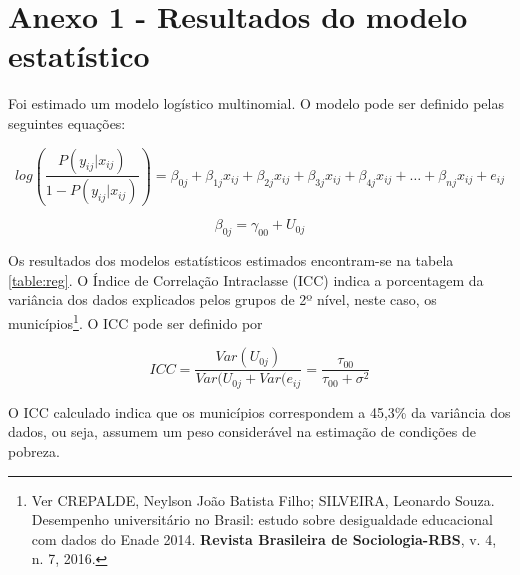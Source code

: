 \documentclass[a4paper, 12pt, openright, oneside, english, brazil, article]{abntex2}
\begin{document}
	\newpage
	
	\postextual
	
	\anexos
	\section*{Anexo 1 - Resultados do modelo estatístico}
	
	Foi estimado um modelo logístico multinomial. O modelo pode ser definido pelas seguintes equações:
	
	$$log \left( \frac{P(y_{ij}|x_{ij})}{1-P(y_{ij}|x_{ij})} \right) = \beta_{0j} + \beta_{1j}x_{ij} + \beta_{2j}x_{ij} + \beta_{3j}x_{ij} + \beta_{4j}x_{ij} +  \dots  + \beta_{nj}x_{ij}  +  e_{ij} $$
	
	$$ \beta_{0j} = \gamma_{00} + U_{0j} $$
	
	Os resultados dos modelos estatísticos estimados encontram-se na tabela \ref{table:reg}. O Índice de Correlação Intraclasse (ICC) indica a porcentagem da variância dos dados explicados pelos grupos de 2º nível, neste caso, os municípios\footnote{Ver CREPALDE, Neylson João Batista Filho; SILVEIRA, Leonardo Souza. Desempenho universitário no Brasil: estudo sobre desigualdade educacional com dados do Enade 2014. \textbf{Revista Brasileira de Sociologia-RBS}, v. 4, n. 7, 2016.}. O ICC pode ser definido por
	
	$$ICC = \frac{Var(U_{0j})}{Var(U_{0j} + Var(e_{ij}} = \frac{\tau_{00}}{\tau_{00} + \sigma^2} $$
	
	O ICC calculado indica que os municípios correspondem a 45,3\% da variância dos dados, ou seja, assumem um peso considerável na estimação de condições de pobreza.
	
\end{document}
